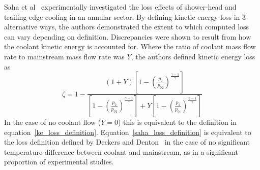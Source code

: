 \documentclass[a4paper, 11pt, oneside]{report}
\begin{document}
Saha et al~\cite{saha_loss} experimentally investigated the loss effects of shower-head and trailing edge cooling in an annular sector. By defining kinetic energy loss in 3 alternative ways, the authors demonstrated the extent to which computed loss can vary depending on definition. Discrepancies were shown to result from how the coolant kinetic energy is accounted for. Where the ratio of coolant mass flow rate to mainstream mass flow rate was $Y$, the authors defined kinetic energy loss as
\begin{equation}\label{saha_loss_definition}
\zeta = 
1 -
\frac{ 
	\left( 1 + Y \right) 
	\left[
		1 -
		\left(
			\frac{p_2}{p_{02}}
		\right)
		^\frac{\gamma-1}{\gamma}
	\right]
}{
	\left[
		1 -
		\left(
			\frac{p_2}{p_{01}}
		\right)
		^\frac{\gamma-1}{\gamma}
	\right]
	+Y
	\left[
		1 -
		\left(
			\frac{p_2}{p_{0c}}
		\right)
		^\frac{\gamma-1}{\gamma}
	\right]
}
\end{equation}
In the case of no coolant flow ($Y=0$) this is equivalent to the definition in equation~\ref{ke_loss_definition}. Equation~\ref{saha_loss_definition} is equivalent to the loss definition defined by Deckers and Denton~\cite{deckers_loss} in the case of no significant temperature difference between coolant and mainstream, as in a significant proportion of experimental studies.
\end{document}
